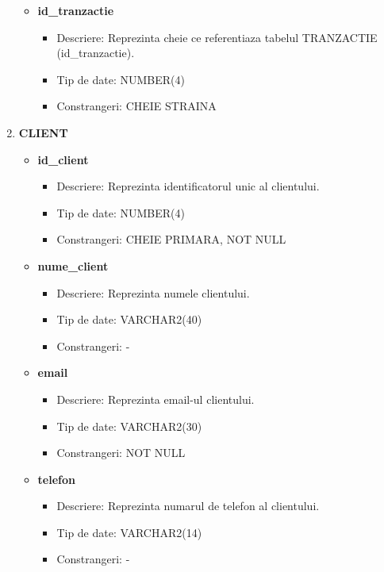 \begin{enumerate}
\begin{itemize}
        \item \textbf{id\_tranzactie}
                \begin{itemize}
                    \item Descriere: Reprezinta cheie ce referentiaza tabelul TRANZACTIE (id\_tranzactie).
                    \item Tip de date: NUMBER(4)
                    \item Constrangeri: CHEIE STRAINA
                \end{itemize}
                
    \end{itemize}

    \vspace{0.5cm}

    \item \textbf{CLIENT}
    \begin{itemize}
    
        \item \textbf{id\_client}
                \begin{itemize}
                    \item Descriere: Reprezinta identificatorul unic al clientului.
                    \item Tip de date: NUMBER(4)
                    \item Constrangeri: CHEIE PRIMARA, NOT NULL
                \end{itemize}

        \item \textbf{nume\_client}
                \begin{itemize}
                    \item Descriere: Reprezinta numele clientului.
                    \item Tip de date: VARCHAR2(40)
                    \item Constrangeri: -
                \end{itemize}
        \item \textbf{email}
                \begin{itemize}
                    \item Descriere: Reprezinta email-ul clientului.
                    \item Tip de date: VARCHAR2(30)
                    \item Constrangeri: NOT NULL
                \end{itemize}

        \item \textbf{telefon}
                \begin{itemize}
                    \item Descriere: Reprezinta numarul de telefon al clientului.
                    \item Tip de date: VARCHAR2(14)
                    \item Constrangeri: -
                \end{itemize}


\end{itemize}
\end{enumerate}
